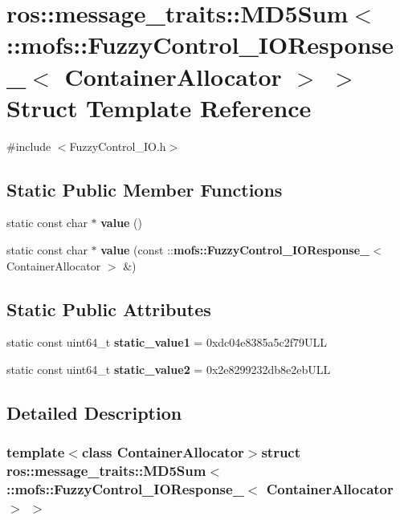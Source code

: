 \section{ros\-:\-:message\-\_\-traits\-:\-:M\-D5\-Sum$<$ \-:\-:mofs\-:\-:Fuzzy\-Control\-\_\-\-I\-O\-Response\-\_\-$<$ Container\-Allocator $>$ $>$ Struct Template Reference}
\label{structros_1_1message__traits_1_1MD5Sum_3_01_1_1mofs_1_1FuzzyControl__IOResponse___3_01ContainerAllocator_01_4_01_4}


{\ttfamily \#include $<$Fuzzy\-Control\-\_\-\-I\-O.\-h$>$}

\subsection*{Static Public Member Functions}
\begin{DoxyCompactItemize}
\item 
static const char $\ast$ {\bf value} ()
\item 
static const char $\ast$ {\bf value} (const \-::{\bf mofs\-::\-Fuzzy\-Control\-\_\-\-I\-O\-Response\-\_\-}$<$ Container\-Allocator $>$ \&)
\end{DoxyCompactItemize}
\subsection*{Static Public Attributes}
\begin{DoxyCompactItemize}
\item 
static const uint64\-\_\-t {\bf static\-\_\-value1} = 0xdc04e8385a5c2f79\-U\-L\-L
\item 
static const uint64\-\_\-t {\bf static\-\_\-value2} = 0x2e8299232db8e2eb\-U\-L\-L
\end{DoxyCompactItemize}


\subsection{Detailed Description}
\subsubsection*{template$<$class Container\-Allocator$>$struct ros\-::message\-\_\-traits\-::\-M\-D5\-Sum$<$ \-::mofs\-::\-Fuzzy\-Control\-\_\-\-I\-O\-Response\-\_\-$<$ Container\-Allocator $>$ $>$}



